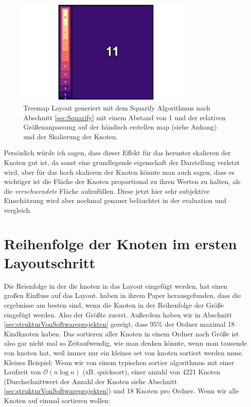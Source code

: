 \begin{figure}
    \centering
    \includegraphics[width=0.8\textwidth]{images/increaseMarginOneScale.png}
    \caption{Treemap Layout generiert mit dem Squarify Algorithmus nach Abschnitt \ref{sec:Squarify} mit einem Abstand von 1 und der relativen Größenanpassung auf der händisch erstellen map (siehe Anhang) und der Skalierung der Knoten.}
    \label{fig:relativeIncreaseMarginOneScale}
\end{figure}

Persönlich würde ich sagen, dass dieser Effekt für das herunter skalieren der Knoten gut ist, da sonst eine grundlegende eigenschaft der Darstellung verletzt wird, aber für das hoch skalieren der Knoten könnte man auch sagen, dass es wichtiger ist die Fläche der Knoten proportional zu ihren Werten zu halten, als die \textit{verschwendete} Fläche aufzufüllen. Diese jetzt hier sehr subjektive Einschätzung wird aber nochmal genauer beläuchtet in der evaluation und vergleich.

\section{Reihenfolge der Knoten im ersten Layoutschritt} \label{sec:ReihenfolgeKnoten}
Die Reienfolge in der die knoten in das Layout eingefügt werden, hat einen großen Einfluss auf das Layout. \cite{johnson1991tree} haben in ihrem Paper herausgefunden, dass die ergebnisse am besten sind, wenn die Knoten in der Reihenfolge der Größe eingefügt werden. Also der Größte zuerst.
Außerdem haben wir in Abschnitt \ref{sec:strukturVonSoftwareprojekten} gezeigt, dass 95\% der Ordner maximal 18 Kindknoten haben. Das sortieren aller Knoten in einem Ordner nach Größe ist also gar nicht mal so Zeitaufwendig, wie man denken könnte, wenn man tausende von knoten hat, weil immer nur ein kleines set von knoten sortiert werden muss. Kleines Beispiel:
Wenn wir von einem typischen sortier algorithmus mit einer Laufzeit von $\mathcal{O}(n\log n)$ (zB. quicksort), einer anzahl von 4221 Knoten (Durchschnittwert der Anzahl der Knoten siehe Abschnitt \ref{sec:strukturVonSoftwareprojekten}) und 18 Knoten pro Ordner. 
Wenn wir alle Knoten auf einmal sortieren wollen: 

